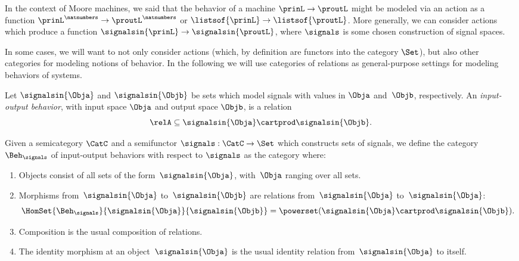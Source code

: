 
   
In the context of Moore machines, we said that the behavior of a machine $\prinL \to \proutL$ might be modeled via an action as a function $\prinL^\natnumbers \to \proutL^\natnumbers$ or $\listsof{\prinL} \to \listsof{\proutL}$. More generally, we can consider actions which produce a function $\signalsin{\prinL} \to \signalsin{\proutL}$, where $\signals$ is some chosen construction of signal spaces. 

In some cases, we will want to not only consider actions (which, by definition are functors into the category $\Set$), but also other categories for modeling notions of behavior. In the following we will use categories of relations as general-purpose settings for modeling behaviors of systems. 

    \begin{definition}
        Let $\signalsin{\Obja}$ and $\signalsin{\Objb}$ be sets which model signals with values in $\Obja$ and~$\Objb$, respectively. 
        An \emph{input-output behavior}, with input space $\Obja$ and output space $\Objb$, is a relation
        \begin{equation*}
            \relA \subseteq \signalsin{\Obja} \cartprod \signalsin{\Objb}.
        \end{equation*}
    \end{definition}

    \begin{definition}
       Given a semicategory $\CatC$ and a semifunctor $\signals: \CatC \to \Set$ which constructs sets of signals, we define the category~$\Beh_\signals$ of input-output behaviors with respect to $\signals$ as the category where:
        \begin{enumerate}
            \item Objects consist of all sets of the form~$\signalsin{\Obja}$, with~$\Obja$ ranging over all sets.
            \item Morphisms from~$\signalsin{\Obja}$ to~$\signalsin{\Objb}$ are relations from~$\signalsin{\Obja}$ to~$\signalsin{\Obja}$:
                  \begin{equation}
                      \HomSet{\Beh_\signals}{\signalsin{\Obja}}{\signalsin{\Objb}} = \powerset (\signalsin{\Obja} \cartprod \signalsin{\Objb}).
                  \end{equation}
            \item Composition is the usual composition of relations.
            \item The identity morphism at an object~$\signalsin{\Obja}$ is the usual identity relation from~$\signalsin{\Obja}$ to itself.
        \end{enumerate}
    \end{definition}

